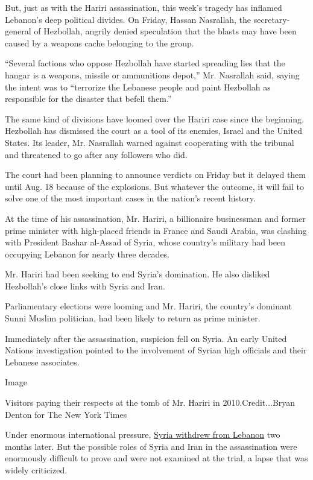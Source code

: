 But, just as with the Hariri assassination, this week's tragedy has
inflamed Lebanon's deep political divides. On Friday, Hassan Nasrallah,
the secretary-general of Hezbollah, angrily denied speculation that the
blasts may have been caused by a weapons cache belonging to the group.

``Several factions who oppose Hezbollah have started spreading lies that
the hangar is a weapons, missile or ammunitions depot,'' Mr. Nasrallah
said, saying the intent was to ``terrorize the Lebanese people and paint
Hezbollah as responsible for the disaster that befell them.''

The same kind of divisions have loomed over the Hariri case since the
beginning. Hezbollah has dismissed the court as a tool of its enemies,
Israel and the United States. Its leader, Mr. Nasrallah warned against
cooperating with the tribunal and threatened to go after any followers
who did.

The court had been planning to announce verdicts on Friday but it
delayed them until Aug. 18 because of the explosions. But whatever the
outcome, it will fail to solve one of the most important cases in the
nation's recent history.

At the time of his assassination, Mr. Hariri, a billionaire businessman
and former prime minister with high-placed friends in France and Saudi
Arabia, was clashing with President Bashar al-Assad of Syria, whose
country's military had been occupying Lebanon for nearly three decades.

Mr. Hariri had been seeking to end Syria's domination. He also disliked
Hezbollah's close links with Syria and Iran.

Parliamentary elections were looming and Mr. Hariri, the country's
dominant Sunni Muslim politician, had been likely to return as prime
minister.

Immediately after the assassination, suspicion fell on Syria. An early
United Nations investigation pointed to the involvement of Syrian high
officials and their Lebanese associates.

Image

Visitors paying their respects at the tomb of Mr. Hariri in
2010.Credit...Bryan Denton for The New York Times

Under enormous international pressure,
\href{https://www.nytimes.com/2005/04/25/world/africa/syria-troops-end-29-years-of-presence-in-lebanon.html?searchResultPosition=8}{Syria
withdrew from Lebanon} two months later. But the possible roles of Syria
and Iran in the assassination were enormously difficult to prove and
were not examined at the trial, a lapse that was widely criticized.

